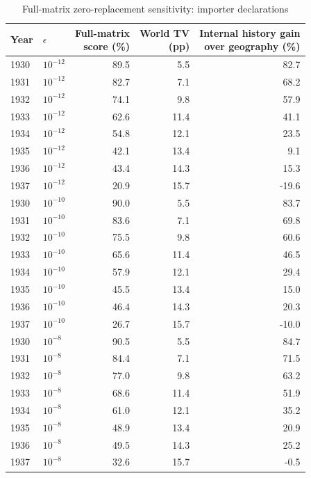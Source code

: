\begin{table}[!htbp]\centering
\caption{Full-matrix zero-replacement sensitivity: importer declarations}\label{tab:app_smoothing_import}
\begin{threeparttable}\small\setlength{\tabcolsep}{4pt}
\begin{tabular}{@{}llrrr@{}}
\toprule
Year & $\epsilon$ & \shortstack{Full-matrix\\score (\%)} & \shortstack{World TV\\(pp)} & \shortstack{Internal history gain\\over geography (\%)} \\
\midrule
1930 & $10^{-12}$ & 89.5 & 5.5 & 82.7 \\
1931 & $10^{-12}$ & 82.7 & 7.1 & 68.2 \\
1932 & $10^{-12}$ & 74.1 & 9.8 & 57.9 \\
1933 & $10^{-12}$ & 62.6 & 11.4 & 41.1 \\
1934 & $10^{-12}$ & 54.8 & 12.1 & 23.5 \\
1935 & $10^{-12}$ & 42.1 & 13.4 & 9.1 \\
1936 & $10^{-12}$ & 43.4 & 14.3 & 15.3 \\
1937 & $10^{-12}$ & 20.9 & 15.7 & -19.6 \\
1930 & $10^{-10}$ & 90.0 & 5.5 & 83.7 \\
1931 & $10^{-10}$ & 83.6 & 7.1 & 69.8 \\
1932 & $10^{-10}$ & 75.5 & 9.8 & 60.6 \\
1933 & $10^{-10}$ & 65.6 & 11.4 & 46.5 \\
1934 & $10^{-10}$ & 57.9 & 12.1 & 29.4 \\
1935 & $10^{-10}$ & 45.5 & 13.4 & 15.0 \\
1936 & $10^{-10}$ & 46.4 & 14.3 & 20.3 \\
1937 & $10^{-10}$ & 26.7 & 15.7 & -10.0 \\
1930 & $10^{-8}$ & 90.5 & 5.5 & 84.7 \\
1931 & $10^{-8}$ & 84.4 & 7.1 & 71.5 \\
1932 & $10^{-8}$ & 77.0 & 9.8 & 63.2 \\
1933 & $10^{-8}$ & 68.6 & 11.4 & 51.9 \\
1934 & $10^{-8}$ & 61.0 & 12.1 & 35.2 \\
1935 & $10^{-8}$ & 48.9 & 13.4 & 20.9 \\
1936 & $10^{-8}$ & 49.5 & 14.3 & 25.2 \\
1937 & $10^{-8}$ & 32.6 & 15.7 & -0.5 \\

\end{tabular}
\end{threeparttable}
\end{table}
